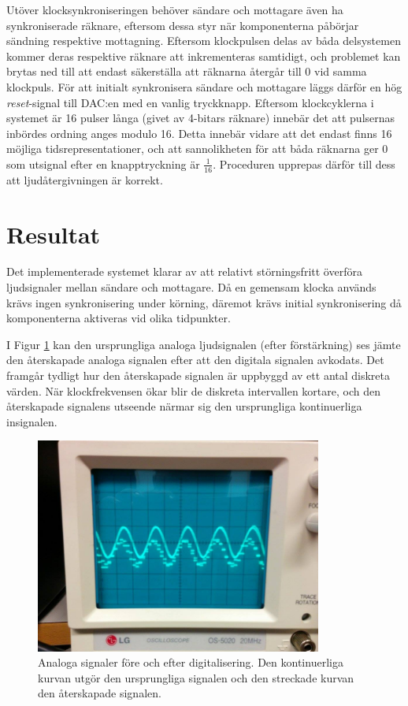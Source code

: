 \documentclass[a4paper,10pt]{article}
\begin{document}
Utöver klocksynkroniseringen behöver sändare och mottagare även ha 
synkroniserade räknare, eftersom dessa styr när komponenterna påbörjar sändning 
respektive mottagning. Eftersom klockpulsen delas av båda delsystemen kommer
deras respektive räknare att inkrementeras samtidigt, och problemet kan brytas
ned till att endast säkerställa att räknarna återgår till 0 vid samma klockpuls. 
För att initialt synkronisera sändare och mottagare läggs därför en hög 
\emph{reset}-signal till DAC:en med en vanlig tryckknapp. Eftersom klockcyklerna 
i systemet är 16 pulser långa (givet av 4-bitars räknare) innebär det att 
pulsernas inbördes ordning anges modulo 16. Detta innebär vidare att det endast 
finns 16 möjliga tidsrepresentationer, och att sannolikheten för att 
båda räknarna ger 0 som utsignal efter en knapptryckning är  $\frac{1}{16}$. 
Proceduren upprepas därför till dess att ljudåtergivningen är korrekt.

\section{Resultat}

Det implementerade systemet klarar av att relativt störningsfritt överföra 
ljudsignaler mellan sändare och mottagare. Då en gemensam klocka används
krävs ingen synkronisering under körning, däremot krävs initial synkronisering
då komponenterna aktiveras vid olika tidpunkter. 

I Figur \ref{oscilloskop} kan den ursprungliga analoga ljudsignalen (efter 
förstärkning) ses jämte den återskapade analoga signalen efter att den digitala
signalen avkodats. Det framgår tydligt hur den återskapade signalen är uppbyggd 
av ett antal diskreta värden. När klockfrekvensen ökar blir de diskreta 
intervallen kortare, och den återskapade signalens utseende närmar sig den 
ursprungliga kontinuerliga insignalen.

\begin{figure}[h]
\centering
\includegraphics[width=0.84\textwidth]{oscilloskop.jpg}
\caption{Analoga signaler före och efter digitalisering. Den kontinuerliga 
         kurvan utgör den ursprungliga signalen och den streckade kurvan den 
	 återskapade signalen.}
\label{oscilloskop}
\end{figure}
\end{document}
